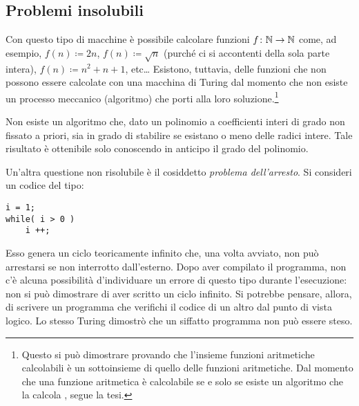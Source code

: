 		\subsection{Problemi insolubili}
		\label{subsec:ins}

Con questo tipo di macchine è possibile calcolare funzioni $f\colon\mathbb{N}\to\mathbb{N}$ come, ad esempio, $f(n)\coloneqq2n$, $f(n)\coloneqq\sqrt{n}$ (purché ci si accontenti della sola parte intera), $f(n)\coloneqq n^2+n+1$, etc\dots{}
Esistono, tuttavia, delle funzioni che non possono essere calcolate con una macchina di Turing dal momento che non esiste un processo meccanico (algoritmo) che porti alla loro soluzione.\footnote{Questo si può dimostrare provando che l'insieme funzioni aritmetiche calcolabili è un sottoinsieme di quello delle funzioni aritmetiche.
Dal momento che una funzione aritmetica è calcolabile se e solo se esiste un algoritmo che la calcola \cite{fp:comp}, segue la tesi.}

Non  esiste un algoritmo che, dato un polinomio a coefficienti interi di grado non fissato a priori, sia in grado di stabilire se esistano o meno delle radici intere.
Tale risultato è ottenibile solo conoscendo in anticipo il grado del polinomio.


Un'altra  questione non risolubile è il cosiddetto \emph{problema dell'arresto}.
Si consideri un codice del tipo:
\begin{lstlisting}
i = 1;
while( i > 0 )
	i ++;
\end{lstlisting}
Esso genera un ciclo teoricamente infinito che, una volta avviato, non può arrestarsi se non interrotto dall'esterno.
Dopo aver compilato il programma, non c'è alcuna possibilità d'individuare un errore di questo tipo durante l'esecuzione: non si può dimostrare di aver scritto un ciclo infinito. %
Si potrebbe pensare, allora, di scrivere un programma che verifichi il codice di un altro dal punto di vista logico.
Lo stesso Turing dimostrò che un siffatto programma non può essere steso.


